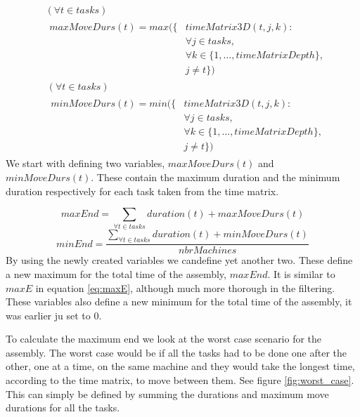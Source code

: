   \begin{equation}
  \begin{aligned}\label{eq:57}
  &( \forall t \in tasks)\\
  &\begin{aligned}
  maxMoveDurs(t) = max(\{&timeMatrix3D(t,j,k) :\\
  &\forall j \in tasks, \\
  &\forall k \in \{1 , \ldots , timeMatrixDepth\},\\
  &j \neq t\})
  \end{aligned}
  \end{aligned}
  \end{equation}
   \begin{equation}
   \begin{aligned}\label{eq:58}
   &(\forall t \in tasks)\\
   &\begin{aligned}
   minMoveDurs(t) = min(\{&timeMatrix3D(t,j,k) :\\
   &\forall j \in tasks, \\
   &\forall k \in \{1 , \ldots , timeMatrixDepth\},\\
   &j \neq t\})
   \end{aligned}
   \end{aligned}
   \end{equation}
 We start with defining two variables, $maxMoveDurs(t)$ and $minMoveDurs(t)$. These contain the maximum duration and the minimum duration respectively for each task taken from the time matrix.
  
  \begin{equation}\label{eq:59}
 	maxEnd = \sum_{\forall t \in tasks} duration(t) + maxMoveDurs(t)
  \end{equation}
  \begin{equation}\label{eq:minEnd}
  	minEnd = \frac{\sum_{\forall t \in tasks} duration(t) + minMoveDurs(t)}{nbrMachines}
  \end{equation}
 By using the newly created variables we candefine yet another two. These define a new maximum for the total time of the assembly, $maxEnd$. It is similar to $maxE$ in equation \ref{eq:maxE}, although much more thorough in the filtering. These variables also define a new minimum for the total time of the assembly, it was earlier ju set to 0.
 
 To calculate the maximum end we look at the worst case scenario for the assembly. The worst case would be if all the tasks had to be done one after the other, one at a time, on the same machine and they would take the longest time, according to the time matrix, to move between them. See figure \ref{fig:worst_case}. This can simply be defined by summing the durations and maximum move durations for all the tasks.
 

